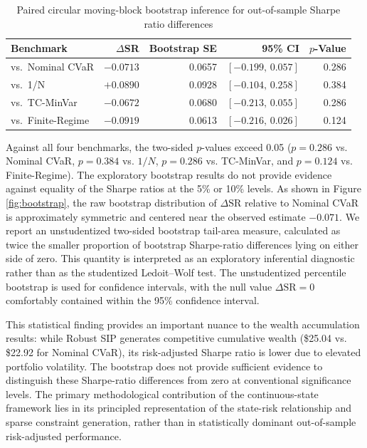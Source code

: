 \documentclass[11pt, a4paper]{article}
\begin{document}
\begin{table}[htbp]
\centering
\caption{Paired circular moving-block bootstrap inference for out-of-sample Sharpe ratio differences}
\label{tab:bootstrap}
\small
\begin{tabular}{lrrrr}
\toprule
\textbf{Benchmark} & \textbf{$\Delta$SR} & \textbf{Bootstrap SE} & \textbf{95\% CI} & \textbf{$p$-Value} \\
\midrule
vs.\ Nominal CVaR & $-0.0713$ & 0.0657 & $[-0.199, \, 0.057]$ & 0.286 \\
vs.\ 1/N & $+0.0890$ & 0.0928 & $[-0.104, \, 0.258]$ & 0.384 \\
vs.\ TC-MinVar & $-0.0672$ & 0.0680 & $[-0.213, \, 0.055]$ & 0.286 \\
vs.\ Finite-Regime & $-0.0919$ & 0.0613 & $[-0.216, \, 0.026]$ & 0.124 \\
\bottomrule
\end{tabular}
\end{table}

Against all four benchmarks, the two-sided $p$-values exceed 0.05 ($p = 0.286$ vs. Nominal CVaR, $p = 0.384$ vs. $1/N$, $p = 0.286$ vs. TC-MinVar, and $p = 0.124$ vs. Finite-Regime). The exploratory bootstrap results do not provide evidence against equality of the Sharpe ratios at the 5\% or 10\% levels. As shown in Figure \ref{fig:bootstrap}, the raw bootstrap distribution of $\Delta \text{SR}$ relative to Nominal CVaR is approximately symmetric and centered near the observed estimate $-0.071$. We report an unstudentized two-sided bootstrap tail-area measure, calculated as twice the smaller proportion of bootstrap Sharpe-ratio differences lying on either side of zero. This quantity is interpreted as an exploratory inferential diagnostic rather than as the studentized Ledoit--Wolf test. The unstudentized percentile bootstrap is used for confidence intervals, with the null value $\Delta \text{SR} = 0$ comfortably contained within the 95\% confidence interval.

This statistical finding provides an important nuance to the wealth accumulation results: while Robust SIP generates competitive cumulative wealth (\$25.04 vs. \$22.92 for Nominal CVaR), its risk-adjusted Sharpe ratio is lower due to elevated portfolio volatility. The bootstrap does not provide sufficient evidence to distinguish these Sharpe-ratio differences from zero at conventional significance levels. The primary methodological contribution of the continuous-state framework lies in its principled representation of the state-risk relationship and sparse constraint generation, rather than in statistically dominant out-of-sample risk-adjusted performance.
\end{document}
